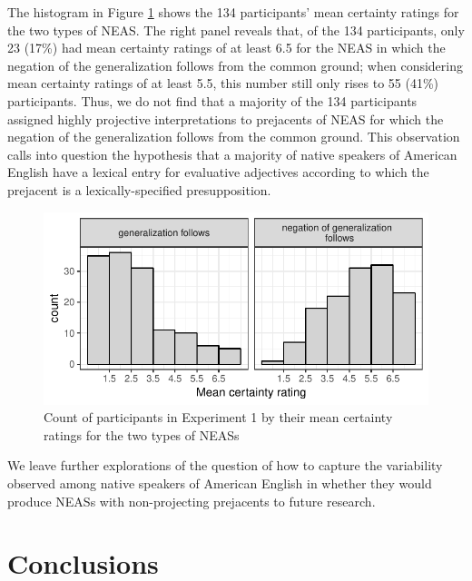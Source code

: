 \documentclass[11pt,fleqn]{article}
\newcommand{\6}{\mbox{$[\hspace*{-.6mm}[$}}
\newcommand{\9}{\mbox{$]\hspace*{-.6mm}]$}}
\begin{document}
The histogram in Figure \ref{f-dialect} shows the 134 participants' mean certainty ratings for the two types of NEAS. The right panel reveals that, of the 134 participants, only 23 (17\%) had mean certainty ratings of at least 6.5 for the NEAS in which the negation of the generalization follows from the common ground; when considering mean certainty ratings of at least 5.5, this number still only rises to 55 (41\%) participants. Thus, we do not find that a majority of the 134 participants assigned highly projective interpretations to prejacents of NEAS for which the negation of the generalization follows from the common ground. This observation calls into question the hypothesis that a majority of native speakers of American English have a lexical entry for evaluative adjectives according to which the prejacent is a lexically-specified presupposition. 


\begin{figure}[h!]
\begin{center}
\includegraphics[scale=.9]{../exp2-projection/graphs/count-of-participants}

\caption{Count of participants in Experiment 1 by their mean certainty ratings for the two types of NEASs}\label{f-dialect}
\end{center}
\end{figure}

We leave further explorations of the question of how to capture the variability observed among native speakers of American English in whether they would produce NEASs with non-projecting prejacents to future research.

\section{Conclusions}\label{s6}
\end{document}
